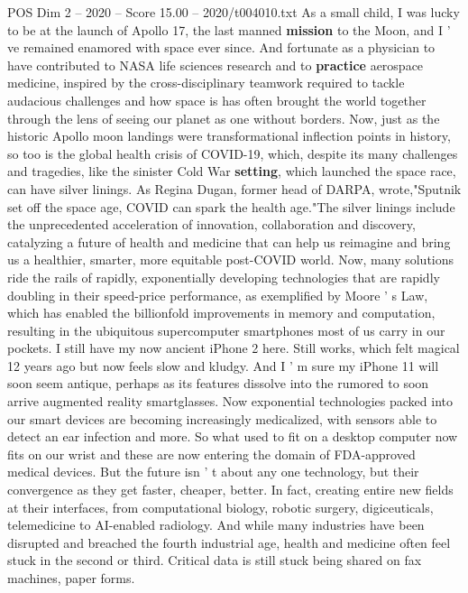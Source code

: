 \begin{textsample}{POS Dim 2 – 2020 – Score 15.00 – 2020/t004010.txt}  \label{ex:f2_pos_016}
As a small child, I was lucky to be at the launch of Apollo 17, the last manned \textbf{mission} to the Moon, and I ' ve remained enamored with space ever since.
And fortunate as a physician to have contributed to NASA life sciences research and to \textbf{practice} aerospace medicine, inspired by the cross-disciplinary teamwork required to tackle audacious challenges and how space is has often brought the world together through the lens of seeing our planet as one without borders.
Now, just as the historic Apollo moon landings were transformational inflection points in history, so too is the global health crisis of COVID-19, which, despite its many challenges and tragedies, like the sinister Cold War \textbf{setting}, which launched the space race, can have silver linings.
As Regina Dugan, former head of DARPA, wrote,"Sputnik set off the space age, COVID can spark the health age."The silver linings include the unprecedented acceleration of innovation, collaboration and discovery, catalyzing a future of health and medicine that can help us reimagine and bring us a healthier, smarter, more equitable post-COVID world.
Now, many solutions ride the rails of rapidly, exponentially developing technologies that are rapidly doubling in their speed-price performance, as exemplified by Moore ' s Law, which has enabled the billionfold improvements in memory and computation, resulting in the ubiquitous supercomputer smartphones most of us carry in our pockets.
I still have my now ancient iPhone 2 here.
Still works, which felt magical 12 years ago but now feels slow and kludgy.
And I ' m sure my iPhone 11 will soon seem antique, perhaps as its features dissolve into the rumored to soon arrive augmented reality smartglasses.
Now exponential technologies packed into our smart devices are becoming increasingly medicalized, with sensors able to detect an ear infection and more.
So what used to fit on a desktop computer now fits on our wrist and these are now entering the domain of FDA-approved medical devices.
But the future isn ' t about any one technology, but their convergence as they get faster, cheaper, better.
In fact, creating entire new fields at their interfaces, from computational biology, robotic surgery, digiceuticals, telemedicine to AI-enabled radiology.
And while many industries have been disrupted and breached the fourth industrial age, health and medicine often feel stuck in the second or third.
Critical data is still stuck being shared on fax machines, paper forms.

\end{textsample}
